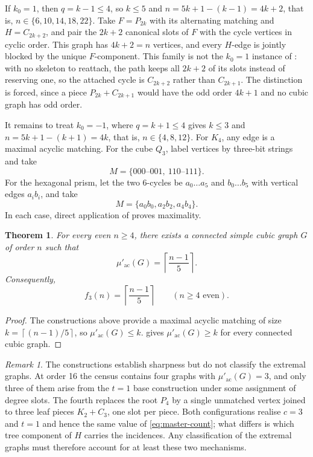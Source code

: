 \documentclass[smallextended,natbib,nospthms]{svjour3}
\newtheorem{theorem}{Theorem}[section]
\theoremstyle{definition}
\theoremstyle{remark}
\newtheorem{remark}[remark]{Remark}
\newcommand{\acnum}{\mu'_{\mathrm{ac}}}
\newcommand{\ceil}[1]{\left\lceil #1\right\rceil}
\begin{document}
If $k_0=1$, then $q=k-1\leq 4$, so $k\leq 5$ and
$n=5k+1-(k-1)=4k+2$, that is, $n\in\{6,10,14,18,22\}$. Take
$F=P_{2k}$ with its alternating matching and $H=C_{2k+2}$, and pair the
$2k+2$ canonical slots of $F$ with the cycle vertices in cyclic order. This graph
has $4k+2=n$ vertices, and every $H$-edge is jointly blocked by the unique
$F$-component. This family is not the $k_0=1$ instance of
: with no skeleton to reattach, the path keeps all
$2k+2$ of its slots instead of reserving one, so the attached cycle is
$C_{2k+2}$ rather than $C_{2k+1}$. The distinction is forced, since a piece
$P_{2k}+C_{2k+1}$ would have the odd order $4k+1$ and no cubic graph has odd
order.

It remains to treat $k_0=-1$, where $q=k+1\leq 4$ gives $k\leq 3$ and
$n=5k+1-(k+1)=4k$, that is, $n\in\{4,8,12\}$. For $K_4$, any edge is a maximal
acyclic matching. For the cube $Q_3$, label vertices by three-bit strings and
take
\[
  M=\{000\text{--}001,\ 110\text{--}111\}.
\]
For the hexagonal prism, let the two 6-cycles be
$a_0\ldots a_5$ and $b_0\ldots b_5$ with vertical edges $a_ib_i$, and take
\[
  M=\{a_0b_0,a_2b_2,a_4b_4\}.
\]
In each case, direct application of  proves maximality.

\begin{theorem}
\label{thm:extremal}
For every even $n\geq 4$, there exists a connected simple cubic graph $G$ of
order $n$ such that
\[
  \acnum(G)=\ceil{\frac{n-1}{5}}.
\]
Consequently,
\[
  f_3(n)=\ceil{\frac{n-1}{5}}
  \qquad(n\geq 4\text{ even}).
\]
\end{theorem}

\begin{proof}
The constructions above provide a maximal acyclic matching of size
$k=\ceil{(n-1)/5}$, so $\acnum(G)\leq k$.
 gives $\acnum(G)\geq k$ for every connected cubic graph.
\end{proof}

\begin{remark}
\label{rem:non-uniqueness}
The constructions establish sharpness but do not classify the extremal graphs.
At order 16 the census contains four graphs with $\acnum(G)=3$, and only three
of them arise from the $t=1$ base construction under some assignment of degree
slots. The fourth replaces the root $P_4$ by a single unmatched vertex joined
to three leaf pieces $K_2+C_3$, one slot per piece. Both configurations
realise $c=3$ and $t=1$ and hence the same value of \eqref{eq:master-count};
what differs is which tree component of $H$ carries the incidences. Any
classification of the extremal graphs must therefore account for at least
these two mechanisms.
\end{remark}
\end{document}
